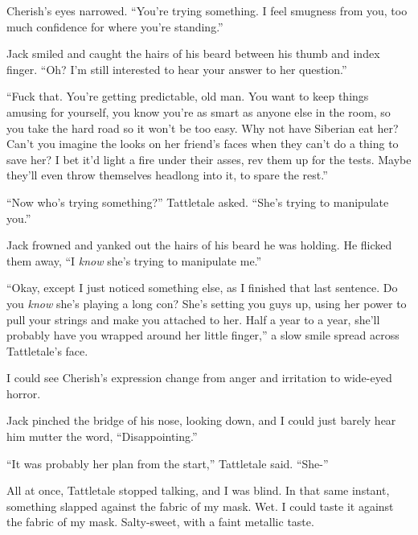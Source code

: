 Cherish's eyes narrowed.  ``You're trying something.  I feel smugness from you, too much confidence for where you're standing.''



Jack smiled and caught the hairs of his beard between his thumb and index finger.  ``Oh?  I'm still interested to hear your answer to her question.''



``Fuck that.  You're getting predictable, old man.  You want to keep things amusing for yourself, you know you're as smart as anyone else in the room, so you take the hard road so it won't be too easy.  Why not have Siberian eat her?  Can't you imagine the looks on her friend's faces when they can't do a thing to save her?  I bet it'd light a fire under their asses, rev them up for the tests.  Maybe they'll even throw themselves headlong into it, to spare the rest.''



``Now who's trying something?'' Tattletale asked.  ``She's trying to manipulate you.''



Jack frowned and yanked out the hairs of his beard he was holding.  He flicked them away, ``I \emph{know} she's trying to manipulate me.''



``Okay, except I just noticed something else, as I finished that last sentence.  Do you \emph{know} she's playing a long con?  She's setting you guys up, using her power to pull your strings and make you attached to her.  Half a year to a year, she'll probably have you wrapped around her little finger,'' a slow smile spread across Tattletale's face.



I could see Cherish's expression change from anger and irritation to wide-eyed horror.



Jack pinched the bridge of his nose, looking down, and I could just barely hear him mutter the word, ``Disappointing.''



``It was probably her plan from the start,'' Tattletale said.  ``She-''



All at once, Tattletale stopped talking, and I was blind.  In that same instant, something slapped against the fabric of my mask.  Wet.  I could taste it against the fabric of my mask.  Salty-sweet, with a faint metallic taste.



